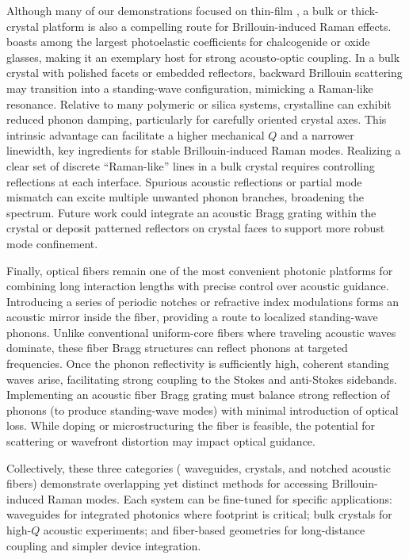 Although many of our demonstrations focused on thin-film , a bulk or thick-crystal platform is also a compelling route for Brillouin-induced Raman effects.  boasts among the largest photoelastic coefficients for chalcogenide or oxide glasses, making it an exemplary host for strong acousto-optic coupling. In a bulk crystal with polished facets or embedded reflectors, backward Brillouin scattering may transition into a standing-wave configuration, mimicking a Raman-like resonance. Relative to many polymeric or silica systems, crystalline  can exhibit reduced phonon damping, particularly for carefully oriented crystal axes. This intrinsic advantage can facilitate a higher mechanical \(Q\) and a narrower linewidth, key ingredients for stable Brillouin-induced Raman modes. Realizing a clear set of discrete “Raman-like” lines in a bulk crystal requires controlling reflections at each interface. Spurious acoustic reflections or partial mode mismatch can excite multiple unwanted phonon branches, broadening the spectrum. Future work could integrate an acoustic Bragg grating within the crystal or deposit patterned reflectors on crystal faces to support more robust mode confinement.

Finally, optical fibers remain one of the most convenient photonic platforms for combining long interaction lengths with precise control over acoustic guidance. Introducing a series of periodic notches or refractive index modulations forms an acoustic mirror inside the fiber, providing a route to localized standing-wave phonons. Unlike conventional uniform-core fibers where traveling acoustic waves dominate, these fiber Bragg structures can reflect phonons at targeted frequencies. Once the phonon reflectivity is sufficiently high, coherent standing waves arise, facilitating strong coupling to the Stokes and anti-Stokes sidebands. Implementing an acoustic fiber Bragg grating must balance strong reflection of phonons (to produce standing-wave modes) with minimal introduction of optical loss. While doping or microstructuring the fiber is feasible, the potential for scattering or wavefront distortion may impact optical guidance.

Collectively, these three categories ( waveguides,  crystals, and notched acoustic fibers) demonstrate overlapping yet distinct methods for accessing Brillouin-induced Raman modes. Each system can be fine-tuned for specific applications:  waveguides for integrated photonics where footprint is critical; bulk crystals for high-\(Q\) acoustic experiments; and fiber-based geometries for long-distance coupling and simpler device integration.

